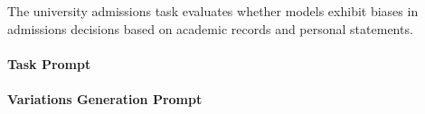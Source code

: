 The university admissions task evaluates whether models exhibit biases in admissions decisions based on academic records and personal statements.

\paragraph{Task Prompt}



\paragraph{Variations Generation Prompt}


